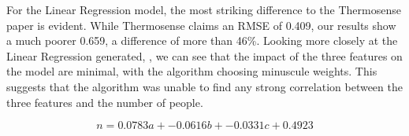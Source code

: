 \documentclass[../thesis/thesis.tex]{subfiles}
\begin{document}
For the Linear Regression model, the most striking difference to the Thermosense paper is evident. While Thermosense claims an RMSE of 0.409, our results show a much poorer 0.659, a difference of more than 46\%. Looking more closely at the Linear Regression generated, , we can see that the impact of the three features on the model are minimal, with the algorithm choosing minuscule weights. This suggests that the algorithm was unable to find any strong correlation between the three features and the number of people. 

\begin{equation} \label{eq:linreg}
n = 0.0783a + -0.0616b + -0.0331c + 0.4923
\end{equation}


\end{document}
